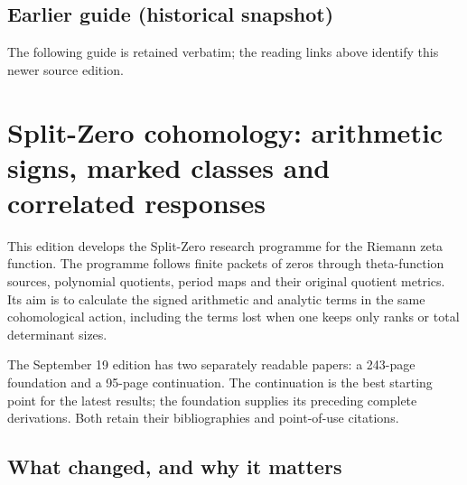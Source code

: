 \documentclass[
]{article}
\begin{document}
\subsection{Earlier guide (historical
snapshot)}\label{earlier-guide-historical-snapshot-1}

The following guide is retained verbatim; the reading links above
identify this newer source edition.

\section{Split-Zero cohomology: arithmetic signs, marked classes and
correlated
responses}\label{split-zero-cohomology-arithmetic-signs-marked-classes-and-correlated-responses}

This edition develops the Split-Zero research programme for the Riemann
zeta function. The programme follows finite packets of zeros through
theta-function sources, polynomial quotients, period maps and their
original quotient metrics. Its aim is to calculate the signed arithmetic
and analytic terms in the same cohomological action, including the terms
lost when one keeps only ranks or total determinant sizes.

The September 19 edition has two separately readable papers: a 243-page
foundation and a 95-page continuation. The continuation is the best
starting point for the latest results; the foundation supplies its
preceding complete derivations. Both retain their bibliographies and
point-of-use citations.

\subsection{What changed, and why it
matters}\label{what-changed-and-why-it-matters}
\end{document}
